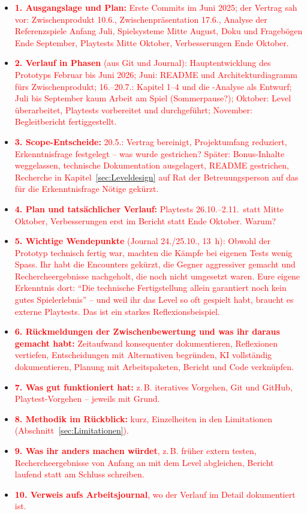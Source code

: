 \documentclass[../Main.tex]{subfiles}
\begin{document}
\begin{itemize}[leftmargin=1.5cm]
    \item \textcolor{red}{\textbf{1. Ausgangslage und Plan:} Erste Commits im Juni 2025; der Vertrag sah vor: Zwischenprodukt 10.6., Zwischenpräsentation 17.6., Analyse der Referenzspiele Anfang Juli, Spielsysteme Mitte August, Doku und Fragebögen Ende September, Playtests Mitte Oktober, Verbesserungen Ende Oktober.}
    \item \textcolor{red}{\textbf{2. Verlauf in Phasen} (aus Git und Journal): Hauptentwicklung des Prototyps Februar bis Juni 2026; Juni: README und Architekturdiagramm fürs Zwischenprodukt; 16.--20.7.: Kapitel 1--4 und die -Analyse als Entwurf; Juli bis September kaum Arbeit am Spiel (Sommerpause?); Oktober: Level überarbeitet, Playtests vorbereitet und durchgeführt; November: Begleitbericht fertiggestellt.}
    \item \textcolor{red}{\textbf{3. Scope-Entscheide:} 20.5.: Vertrag bereinigt, Projektumfang reduziert, Erkenntnisfrage festgelegt -- was wurde gestrichen? Später: Bonus-Inhalte weggelassen, technische Dokumentation ausgelagert, README gestrichen, Recherche in Kapitel~\ref{sec:Leveldesign} auf Rat der Betreuungsperson auf das für die Erkenntnisfrage Nötige gekürzt.}
    \item \textcolor{red}{\textbf{4. Plan und tatsächlicher Verlauf:} Playtests 26.10.--2.11.\ statt Mitte Oktober, Verbesserungen erst im Bericht statt Ende Oktober. Warum?}
    \item \textcolor{red}{\textbf{5. Wichtige Wendepunkte} (Journal 24./25.10., 13~h): Obwohl der Prototyp technisch fertig war, machten die Kämpfe bei eigenen Tests wenig Spass. Ihr habt die Encounters gekürzt, die Gegner aggressiver gemacht und Rechercheergebnisse nachgeholt, die noch nicht umgesetzt waren. Eure eigene Erkenntnis dort: \enquote{Die technische Fertigstellung allein garantiert noch kein gutes Spielerlebnis} -- und weil ihr das Level so oft gespielt habt, braucht es externe Playtests. Das ist ein starkes Reflexionsbeispiel.}
    \item \textcolor{red}{\textbf{6. Rückmeldungen der Zwischenbewertung und was ihr daraus gemacht habt:} Zeitaufwand konsequenter dokumentieren, Reflexionen vertiefen, Entscheidungen mit Alternativen begründen, KI vollständig dokumentieren, Planung mit Arbeitspaketen, Bericht und Code verknüpfen.}
    \item \textcolor{red}{\textbf{7. Was gut funktioniert hat:} z.\,B. iteratives Vorgehen, Git und GitHub, Playtest-Vorgehen -- jeweils mit Grund.}
    \item \textcolor{red}{\textbf{8. Methodik im Rückblick:} kurz, Einzelheiten in den Limitationen (Abschnitt~\ref{sec:Limitationen}).}
    \item \textcolor{red}{\textbf{9. Was ihr anders machen würdet}, z.\,B. früher extern testen, Rechercheergebnisse von Anfang an mit dem Level abgleichen, Bericht laufend statt am Schluss schreiben.}
    \item \textcolor{red}{\textbf{10. Verweis aufs Arbeitsjournal}, wo der Verlauf im Detail dokumentiert ist.}
\end{itemize}
\end{document}
